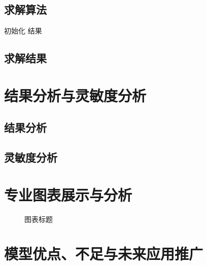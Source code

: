 \subsection{求解算法}
\begin{algorithm}[H]
  \caption{算法名称}
  初始化\;
  \Return 结果\;
\end{algorithm}

\subsection{求解结果}

\section{结果分析与灵敏度分析}

\subsection{结果分析}

\subsection{灵敏度分析}

\section{专业图表展示与分析}

\begin{figure}[H]
  \centering
  \caption{图表标题}
  \label{fig:example}
\end{figure}

\section{模型优点、不足与未来应用推广}

